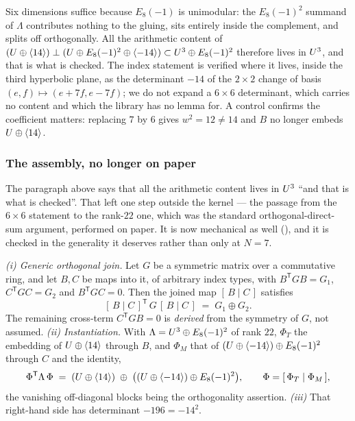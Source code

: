 Six dimensions suffice because $E_8(-1)$ is unimodular: the $E_8(-1)^2$ summand
of $\Lambda$ contributes nothing to the gluing, sits entirely inside the
complement, and splits off orthogonally. All the arithmetic content of
$(U\oplus\langle 14\rangle)\perp(U\oplus E_8(-1)^2\oplus\langle -14\rangle)\subset U^3\oplus E_8(-1)^2$
therefore lives in $U^3$, and that is what is checked. The index statement is
verified where it lives, inside the third hyperbolic plane, as the determinant
$-14$ of the $2\times2$ change of basis $(e,f)\mapsto(e+7f,e-7f)$; we do not
expand a $6\times6$ determinant, which carries no content and which the library
has no lemma for. A control confirms the coefficient matters: replacing $7$ by
$6$ gives $w^2=12\neq14$ and $B$ no longer embeds $U\oplus\langle 14\rangle$.

\subsubsection*{The assembly, no longer on paper}

The paragraph above says that all the arithmetic content lives in $U^3$ ``and
that is what is checked''. That left one step outside the kernel --- the
passage from the $6\times6$ statement to the rank-$22$ one, which was the
standard orthogonal-direct-sum argument, performed on paper. It is now
mechanical as well (), and it
is checked in the generality it deserves rather than only at $N=7$.

\begin{proposition}[status (K)]\label{prop:assembly}
\emph{(i) Generic orthogonal join.} Let $G$ be a symmetric matrix over a
commutative ring, and let $B,C$ be maps into it, of arbitrary index types, with
$B^{\mathsf T}GB = G_1$, $C^{\mathsf T}GC = G_2$ and $B^{\mathsf T}GC = 0$.
Then the joined map $[\,B \mid C\,]$ satisfies
\[
  [\,B \mid C\,]^{\mathsf T}\,G\,[\,B \mid C\,]
  \;=\; G_1 \oplus G_2 .
\]
The remaining cross-term $C^{\mathsf T}GB = 0$ is \emph{derived} from the
symmetry of $G$, not assumed.
\emph{(ii) Instantiation.} With $\Lambda = U^3\oplus E_8(-1)^2$ of rank $22$,
$\Phi_T$ the embedding of $U\oplus\langle 14\rangle$ through $B$, and $\Phi_M$ that of
$(U\oplus\langle -14\rangle)\oplus E_8(-1)^2$ through $C$ and the identity,
\[
  \Phi^{\mathsf T}\Lambda\,\Phi
   \;=\; (U\oplus\langle 14\rangle) \;\oplus\; \bigl((U\oplus\langle -14\rangle)\oplus E_8(-1)^2\bigr),
  \qquad \Phi = [\,\Phi_T \mid \Phi_M\,],
\]
the vanishing off-diagonal blocks being the orthogonality assertion.
\emph{(iii)} That right-hand side has determinant $-196 = -14^2$.
\end{proposition}

